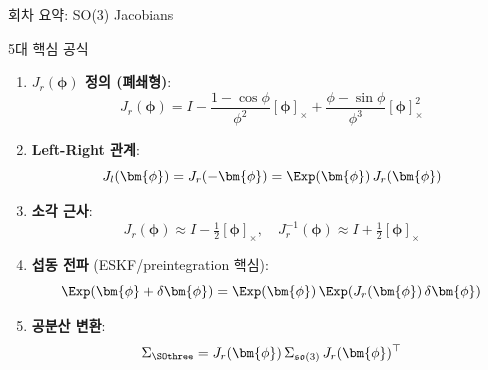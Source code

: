 

\begin{frame}[shrink=5]{회차 요약: SO(3) Jacobians}
  \begin{alertblock}{\large 5대 핵심 공식}
    \begin{enumerate}
      \item \textbf{$J_r(\bm{\phi})$ 정의 (폐쇄형)}:
            \[
              J_r(\bm{\phi}) = I - \frac{1-\cos\phi}{\phi^2}[\bm{\phi}]_\times + \frac{\phi-\sin\phi}{\phi^3}[\bm{\phi}]_\times^2
            \]
      \item \textbf{Left-Right 관계}:
            \[
              J_l(\bm{\phi}) = J_r(-\bm{\phi}) = \Exp(\bm{\phi})\,J_r(\bm{\phi})
            \]
      \item \textbf{소각 근사}:
            \[
              J_r(\bm{\phi}) \approx I - \tfrac{1}{2}[\bm{\phi}]_\times, \quad
              J_r^{-1}(\bm{\phi}) \approx I + \tfrac{1}{2}[\bm{\phi}]_\times
            \]
      \item \textbf{섭동 전파} (ESKF/preintegration 핵심):
            \[
              \Exp(\bm{\phi}+\delta\bm{\phi}) = \Exp(\bm{\phi})\,\Exp\!\left(J_r(\bm{\phi})\,\delta\bm{\phi}\right)
            \]
      \item \textbf{공분산 변환}:
            \[
              \Sigma_{\SOthree} = J_r(\bm{\phi})\,\Sigma_{\mathfrak{so}(3)}\,J_r(\bm{\phi})^\top
            \]
    \end{enumerate}
  \end{alertblock}
\end{frame}


